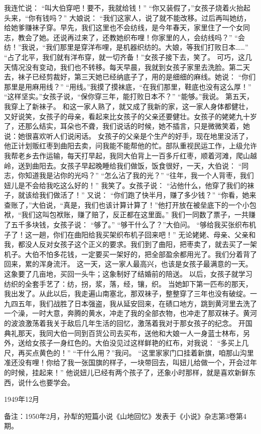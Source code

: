 我连忙说： 
“叫大伯穿吧！要不，我就给钱！” 
“你又装假了，”女孩子烧着火抬起头来，“你有钱吗？” 
大娘说： 
“我们这家人，说了就不能改移。过后再叫她纺，给她爹赚袜子穿。早先，我们这里也不会纺线，是今年春天，家里住了一个女同志，教会了她。还说再过来了，还教她织布哩！你家里的人，会纺线吗？” 
“会纺！”我说，“我们那里是穿洋布哩，是机器织纺的。大娘，等我们打败日本……” 
“占了北平，我们就有洋布穿，就一切齐备！”女孩子接下去，笑了。 
可巧，这几天情况没有变动，我们也不转移。每天早晨，我就到女孩子家里去洗脸。第二天去，袜子已经剪裁好，第三天她已经纳底子了，用的是细细的麻线。她说： 
“你们那里是用麻用线？” 
“用线。”我摸了摸袜底，“在我们那里，鞋底也没有这么厚！” 
“这样坚实。”女孩子说，“保你穿三年，能打败日本不？” 
“能够。”我说。 
第五天，我穿上了新袜子。 
和这一家人熟了，就又成了我新的家，这一家人身体都健壮，又好说笑，女孩子的母亲，看起来比女孩子的父亲还要健壮。女孩子的姥姥九十岁了，还那么结实，耳朵也不聋，我们说话的时候，她不插言，只是微微笑着，她说：她很喜欢听人们说闲话。 
女孩子的父亲是个生产的好手，现在地里没活了，他正计划贩红枣到曲阳去卖，问我能不能帮他的忙。部队重视民运工作，上级允许我帮老乡去作运输，每天打早起，我同大伯背上一百多斤红枣，顺着河滩，爬山越岭，送到曲阳去。女孩子早起晚睡给我们做饭，饭食很好，一天，大伯说： 
“同志，你知道我是沾你的光吗？” 
“怎么沾了我的光？” 
“往年，我一个人背枣，我们妞儿是不会给我吃这么好的！” 
我笑了。女孩子说： 
“沾他什么，他穿了我们的袜子，就该给我们做活了！” 
又说： 
“你们跑了快半月，赚了多少钱？” 
“你看，她来查账了，”大伯说，“真是，我们也该计算计算了！”他打开放在被垒底下的一个小包袱，“我们这叫包袱账，赚了赔了，反正都在这里面。” 
我们一同数了票子，一共赚了五千多块钱，女孩子说： 
“够了。” 
“够干什么了？”大伯问。 
“够给我买张织布机子了！这一趟，你们在曲阳给我买架织布机子回来吧！” 
无论姥姥、母亲、父亲和我，都没人反对女孩子这个正义的要求。我们到了曲阳，把枣卖了，就去买了一架机子。大伯不怕多花钱，一定要买一架好的，把全部盈余都用光了。我们分着背了回来，累的浑身流汗。 
这一天，这一家人最高兴，也该是女孩子最满意的一天。这象要了几亩地，买回一头牛；这象制好了结婚前的陪送。 
以后，女孩子就学习纺织的全套手艺了：纺，拐，浆，落，经，镶，织。 
当她卸下第一匹布的那天，我出发了。从此以后，我走遍山南塞北，那双袜子，整整穿了三年也没有破绽。一九四五年，我们战胜了日本强盗，我从延安回来，在碛口地方，跳到黄河里去洗了一个澡，一时大意，奔腾的黄水，冲走了我的全部衣物，也冲走了那双袜子。黄河的波浪激荡着我关于敌后几年生活的回忆，激荡着我对于那女孩子的纪念。 
开国典礼那天，我同大伯一同到百货公司去买布，送他和大娘一人一身蓝士林布，另外，送给女孩子一身红色的。大伯没见过这样鲜艳的红布，对我说： 
“多买上几尺，再买点黄色的！” 
“干什么用？”我问。 
“这里家家门口挂着新旗，咱那山沟里准还没有哩！你给了我一张国旗的样子，一块带回去，叫妞儿给做一个，开会过年的时候，挂起来！” 
他说妞儿已经有两个孩子了，还象小时那样，就是喜欢新鲜东西，说什么也要学会。 

\hfill 1949年12月

备注：1950年2月，孙犁的短篇小说《山地回忆》发表于《小说》杂志第3卷第4期。